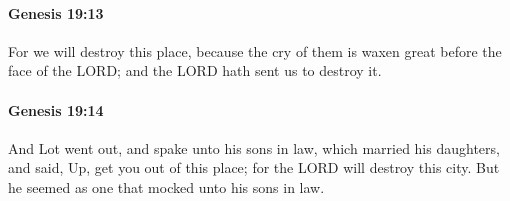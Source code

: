 		\paragraph{Genesis 19:13} %
			\label{GENESIS-19-13}

			For we will destroy this place, because the cry of them is waxen great before the face of the LORD; and the LORD hath sent us to destroy it.


		\paragraph{Genesis 19:14} %
			\label{GENESIS-19-14}

			And Lot went out, and spake unto his sons in law, which married his daughters, and said, Up, get you out of this place; for the LORD will destroy this city. But he seemed as one that mocked unto his sons in law.


